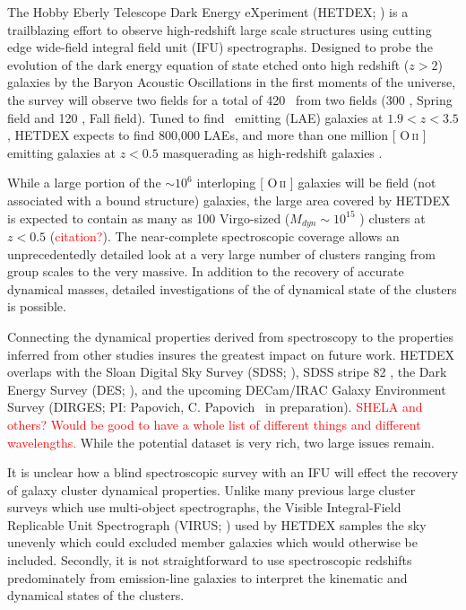 \documentclass[fleqn,usenatbib]{mnras}
\makeatletter
\newcommand{\editorial}[1]{\textcolor{red}{#1}}
\DeclareRobustCommand{\ion}[2]{%
\relax\ifmmode
\ifx\testbx\f@series
{\mathbf{#1\,\mathsc{#2}}}\else
{\mathrm{#1\,\mathsc{#2}}}\fi
\else\textup{#1\,{\mdseries\textsc{#2}}}%
\fi}
\makeatother
\begin{document}
The Hobby Eberly Telescope Dark Energy eXperiment (HETDEX; \citealt{Hill2008}) is a trailblazing effort to observe high-redshift large scale structures using cutting edge wide-field integral field unit (IFU) spectrographs. Designed to probe the evolution of the dark energy equation of state etched onto high redshift ($z>2$) galaxies by the Baryon Acoustic Oscillations \citep{Eisenstein2005} in the first moments of the universe, the survey will observe two fields for a total of 420 \degsq\ from two fields (300 \degsq, Spring field and 120 \degsq, Fall field). Tuned to find \lya\ emitting (LAE) galaxies at $1.9<z<3.5$, HETDEX expects to find 800,000 LAEs, and more than one million [\ion{O}{ii}] emitting galaxies at $z<0.5$ masquerading as high-redshift galaxies \citep{Acquaviva2014}. 

While a large portion of the $\sim10^6$ interloping [\ion{O}{ii}] galaxies will be field (not associated with a bound structure) galaxies, the large area covered by HETDEX is expected to contain as many as 100 Virgo-sized ($M_{dyn}\sim 10^{15}$ \msol) clusters at $z<0.5$ (\editorial{citation?}). The near-complete spectroscopic coverage allows an unprecedentedly detailed look at a very large number of clusters ranging from group scales to the very massive. In addition to the recovery of accurate dynamical masses, detailed investigations of the of dynamical state of the clusters is possible. 

Connecting the dynamical properties derived from spectroscopy to the properties inferred from other studies insures the greatest impact on future work. HETDEX overlaps with the Sloan Digital Sky Survey (SDSS; \citealt{Blanton2001a}), SDSS stripe 82 \citep{Annis2014}, the Dark Energy Survey (DES; \citealt{DES2005}), and the upcoming DECam/IRAC Galaxy Environment Survey (DIRGES; PI: Papovich, C. Papovich \etal\ in preparation). \editorial{SHELA and others? Would be good to have a whole list of different things and different wavelengths.} While the potential dataset is very rich, two large issues remain.

It is unclear how a blind spectroscopic survey with an IFU will effect the recovery of galaxy cluster dynamical properties. Unlike many previous large cluster surveys  which use multi-object spectrographs, the Visible Integral-Field Replicable Unit Spectrograph (VIRUS; \citealt{Hill2012}) used by HETDEX samples the sky unevenly which could excluded member galaxies which would otherwise be included. Secondly, it is not straightforward to use spectroscopic redshifts predominately from emission-line galaxies to interpret the kinematic and dynamical states of the clusters.
\end{document}

